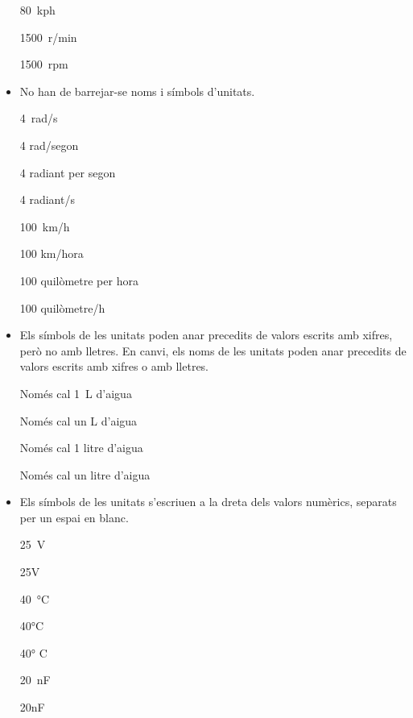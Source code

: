 \begin{itemize}
\textcolor{Red}\faTimesCircle{} \qty{80}{kph}

\textcolor{Green}\faCheckSquare{} \qty{1500}{r/min}

\textcolor{Red}\faTimesCircle{} \qty{1500}{rpm}
	

\item No han de barrejar-se noms i símbols d'unitats.

\textcolor{Green}\faCheckSquare{} \qty{4}{rad/s}

\textcolor{Red}\faTimesCircle{} 4 rad/segon

\textcolor{Green}\faCheckSquare{} 4 radiant per segon

\textcolor{Red}\faTimesCircle{} 4 radiant/s

\textcolor{Green}\faCheckSquare{} \qty{100}{km/h}

\textcolor{Red}\faTimesCircle{} 100 km/hora

\textcolor{Green}\faCheckSquare{} 100 quilòmetre per hora

\textcolor{Red}\faTimesCircle{} 100 quilòmetre/h


\item Els símbols de les unitats  poden anar precedits de valors escrits amb xifres, però no amb lletres. En canvi, els noms de les unitats poden anar precedits de valors escrits amb xifres o amb lletres. 

\textcolor{Green}\faCheckSquare{} Només cal \qty{1}{L} d'aigua

\textcolor{Red}\faTimesCircle{} Només cal un L d'aigua

\textcolor{Green}\faCheckSquare{} Només cal 1 litre d'aigua

\textcolor{Green}\faCheckSquare{} Només cal un litre d'aigua



\item Els símbols de les unitats s'escriuen a la dreta dels valors
numèrics, separats per un espai en blanc.

\textcolor{Green}\faCheckSquare{} \qty{25}{V}

\textcolor{Red}\faTimesCircle{} 25V

\textcolor{Green}\faCheckSquare{} \qty{40}{\degreeCelsius}

\textcolor{Red}\faTimesCircle{} 40\unit{\degreeCelsius}

\textcolor{Red}\faTimesCircle{} 40\unit{\degree} C

\textcolor{Green}\faCheckSquare{} \qty{20}{nF}

\textcolor{Red}\faTimesCircle{} 20nF



\end{itemize}
